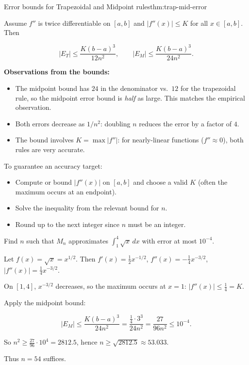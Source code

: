 \begin{theorem}{Error bounds for Trapezoidal and Midpoint rules}{thm:trap-mid-error}

Assume $f''$ is twice differentiable on $[a,b]$ and $|f''(x)|\le K$ for all $x\in[a,b]$. Then

\[
|E_T| \le \frac{K(b-a)^3}{12n^2},\qquad
|E_M| \le \frac{K(b-a)^3}{24n^2}.
\]

\end{theorem}

\textbf{Observations from the bounds:}
\begin{itemize}[leftmargin=*]
\item The midpoint bound has $24$ in the denominator vs.\ $12$ for the trapezoidal rule, so the midpoint error bound is \emph{half} as large. This matches the empirical observation.
\item Both errors decrease as $1/n^2$: doubling $n$ reduces the error by a factor of $4$.
\item The bound involves $K = \max|f''|$: for nearly-linear functions ($f''\approx 0$), both rules are very accurate.
\end{itemize}

\begin{examtip}[title={Exam Focus: Using error bounds efficiently}]

To guarantee an accuracy target:

\begin{itemize}
\item Compute or bound $|f''(x)|$ on $[a,b]$ and choose a valid $K$ (often the maximum occurs at an endpoint).
\item Solve the inequality from the relevant bound for $n$.
\item Round up to the next integer since $n$ must be an integer.
\end{itemize}

\end{examtip}

\begin{examplebox}[title={Worked Example: Choose $n$ for midpoint accuracy}]

Find $n$ such that $M_n$ approximates $\int_1^4\sqrt{x}\,dx$ with error at most $10^{-4}$.

Let $f(x)=\sqrt{x}=x^{1/2}$. Then $f'(x)=\frac12 x^{-1/2}$, $f''(x)=-\frac14 x^{-3/2}$, $|f''(x)|=\frac14 x^{-3/2}$.

On $[1,4]$, $x^{-3/2}$ decreases, so the maximum occurs at $x=1$: $|f''(x)|\le \frac14 = K$.

Apply the midpoint bound:

\[
|E_M| \le \frac{K(b-a)^3}{24n^2} = \frac{\frac14\cdot 3^3}{24n^2} = \frac{27}{96n^2} \le 10^{-4}.
\]

So $n^2 \ge \frac{27}{96}\cdot 10^4 = 2812.5$, hence $n \ge \sqrt{2812.5}\approx 53.033$.

Thus $n=54$ suffices.

\end{examplebox}

